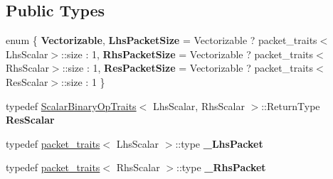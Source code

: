 \subsection*{Public Types}
\begin{DoxyCompactItemize}
\item 
\mbox{\label{struct_eigen_1_1internal_1_1general__matrix__vector__product_3_01_index_00_01_lhs_scalar_00_01_l24320a1e63993864008333cadda60258_a30cc3b94e724b38f37edf50c5950a5ac}} 
enum \{ {\bfseries Vectorizable}, 
{\bfseries Lhs\+Packet\+Size} = Vectorizable ? packet\+\_\+traits$<$Lhs\+Scalar$>$\+::size \+: 1, 
{\bfseries Rhs\+Packet\+Size} = Vectorizable ? packet\+\_\+traits$<$Rhs\+Scalar$>$\+::size \+: 1, 
{\bfseries Res\+Packet\+Size} = Vectorizable ? packet\+\_\+traits$<$Res\+Scalar$>$\+::size \+: 1
 \}
\item 
\mbox{\label{struct_eigen_1_1internal_1_1general__matrix__vector__product_3_01_index_00_01_lhs_scalar_00_01_l24320a1e63993864008333cadda60258_a4b5437643d10b8c62c3d563f64f5cc33}} 
typedef \mbox{\hyperlink{struct_eigen_1_1_scalar_binary_op_traits}{Scalar\+Binary\+Op\+Traits}}$<$ Lhs\+Scalar, Rhs\+Scalar $>$\+::Return\+Type {\bfseries Res\+Scalar}
\item 
\mbox{\label{struct_eigen_1_1internal_1_1general__matrix__vector__product_3_01_index_00_01_lhs_scalar_00_01_l24320a1e63993864008333cadda60258_a3793a43c5edfb50f5ff0e6a97038ea65}} 
typedef \mbox{\hyperlink{struct_eigen_1_1internal_1_1packet__traits}{packet\+\_\+traits}}$<$ Lhs\+Scalar $>$\+::type {\bfseries \+\_\+\+Lhs\+Packet}
\item 
\mbox{\label{struct_eigen_1_1internal_1_1general__matrix__vector__product_3_01_index_00_01_lhs_scalar_00_01_l24320a1e63993864008333cadda60258_ac43fffe804640b476e9cc08636be2e75}} 
typedef \mbox{\hyperlink{struct_eigen_1_1internal_1_1packet__traits}{packet\+\_\+traits}}$<$ Rhs\+Scalar $>$\+::type {\bfseries \+\_\+\+Rhs\+Packet}

\end{DoxyCompactItemize}
